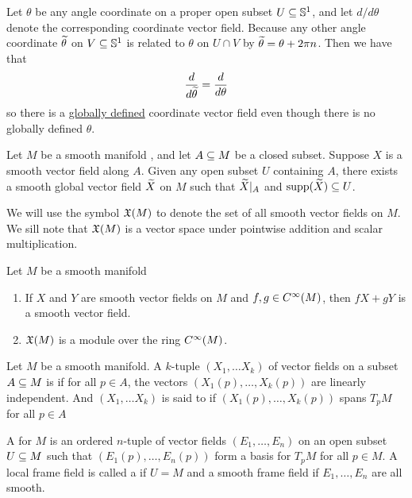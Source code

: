\begin{ex}
Let $\theta$ be any angle coordinate on a proper open subset $U\subseteq \mathbb{S}^1$, and let $d/d\theta$ denote the corresponding coordinate vector field. Because any other angle coordinate $\widetilde\theta$ on $V\subseteq \mathbb{S}^1$ is related to $\theta$ on $U\cap V$ by $\widetilde\theta = \theta + 2\pi n$. Then we have that
\[\frac{d}{d\widetilde \theta} = \frac{d}{d\theta}\]
so there is a \ul{globally defined} coordinate vector field even though there is no globally defined $\theta$.
\end{ex}

\setcounter{thm}{5}

\begin{lem}
Let $M$ be a smooth manifold \wowob, and let $A\subseteq M$ be a closed subset. Suppose $X$ is a smooth vector field along $A$. Given any open subset $U$ containing $A$, there exists a smooth global vector field $\widetilde X$ on $M$ such that $\widetilde X|_A$ and $\text{supp}(\widetilde X)\subseteq U$.
\end{lem}

\nb We will use the symbol $\mathfrak{X}(M)$ to denote the set of all smooth vector fields on $M$. We sill note that $\mathfrak{X}(M)$ is a vector space under pointwise addition and scalar multiplication.


\setcounter{thm}{7}

\begin{prop}
Let $M$ be a smooth manifold \wowob
\begin{enumerate}
    \item If $X$ and $Y$ are smooth vector fields on $M$ and $f,g\in C^\infty(M)$, then $fX + gY$ is a smooth vector field.
    \item $\mathfrak{X}(M)$ is a module over the ring $C^\infty(M)$.
\end{enumerate}
\end{prop}

\dfn Let $M$ be a smooth manifold. A $k$-tuple $(X_1,\ldots X_k)$ of vector fields on a subset $A\subseteq M$ is  if for all $p\in A$, the vectors $(X_1(p),\ldots,X_k(p))$ are linearly independent. And $(X_1,\ldots X_k)$ is said to  if $(X_1(p),\ldots,X_k(p))$ spans $T_pM$ for all $p\in A$

\dfn A  for $M$ is an ordered $n$-tuple of vector fields $(E_1,\ldots,E_n)$ on an open subset $U\subseteq M$ such that $(E_1(p),\ldots,E_n(p))$ form a basis for $T_pM$ for all $p\in M$. A local frame field is called a  if $U = M$ and a smooth frame field if $E_1,\ldots,E_n$ are all smooth.

